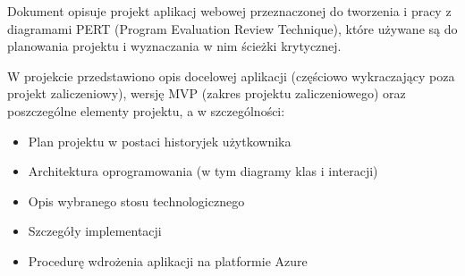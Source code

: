 Dokument opisuje projekt aplikacj webowej przeznaczonej do tworzenia i pracy z diagramami PERT (Program Evaluation Review Technique), które używane są do planowania projektu i wyznaczania w nim ścieżki krytycznej.

W projekcie przedstawiono opis docelowej aplikacji (częściowo wykraczający poza projekt zaliczeniowy), wersję MVP (zakres projektu zaliczeniowego) oraz poszczególne elementy projektu, a w szczególności:
\begin{itemize}
	\item Plan projektu w postaci historyjek użytkownika
	\item Architektura oprogramowania (w tym diagramy klas i interacji)
	\item Opis wybranego stosu technologicznego
	\item Szczegóły implementacji
	\item Procedurę wdrożenia aplikacji na platformie Azure
\end{itemize}